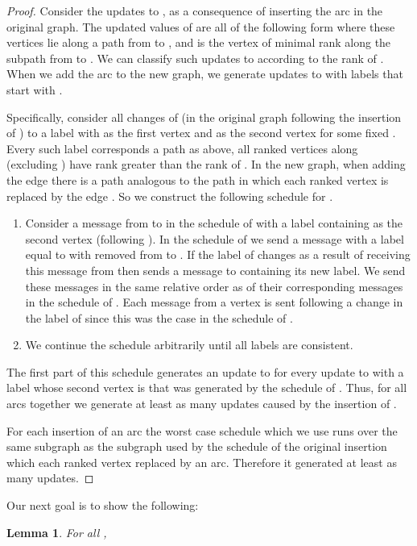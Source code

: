 \documentclass[11pt]{article}
\theoremstyle{plain}
\newtheorem{lem}[thm]{Lemma}
\theoremstyle{definition}
\theoremstyle{remark}
\numberwithin{equation}{section}
\begin{document}
\begin{proof}
Consider the updates to , as a consequence of inserting the
arc  in the original graph. The updated values of
 are all of the following form  where these vertices lie along a path from
 to , and  is the vertex of minimal rank
along the subpath from  to .
   We can classify such updates to  according to the rank of . When we add the arc  to the new graph, we generate updates to  with labels that start with .

Specifically, consider all changes of  (in the original
graph following the insertion of ) to a label with
 as the first vertex and  as the second
vertex for some fixed . Every such label corresponds a path 
as above, all ranked vertices along  (excluding ) have
rank greater than the rank of . In the new graph, when adding
the edge  there is a path analogous to the path  in
which each ranked vertex  is replaced by the edge . So we
construct the following schedule for .
\begin{enumerate}
\item
Consider a message from  to  in the schedule of 
with a label  containing  as the second vertex (following
). In the schedule of   we send a message
with a label equal to  with  removed from  to
. If the label of  changes as a result of receiving this
message from  then  sends a message to  containing its
new label. We send these messages in the same relative order as of
their corresponding messages in the schedule of .
Each message from
a vertex  is sent following a change in the label of  since
this was the case in the schedule of .
\item
We continue the schedule arbitrarily until all labels are
consistent.
\end{enumerate}
The first part of this schedule generates an update to  for
every update to  with a label whose second vertex is 
that was generated by the schedule of . Thus,  for all
arcs  together we generate at least as many updates
caused by the insertion of .

For each insertion of an arc  the
worst case schedule which we use runs over the same subgraph as the
subgraph used by the schedule of the  original insertion which each
ranked vertex replaced by an arc. Therefore it generated at least as
many updates.
    \end{proof}



Our next goal is to show the following:


\begin{lem} \label{lem:changes}
For all , 
\end{lem}
\end{document}
